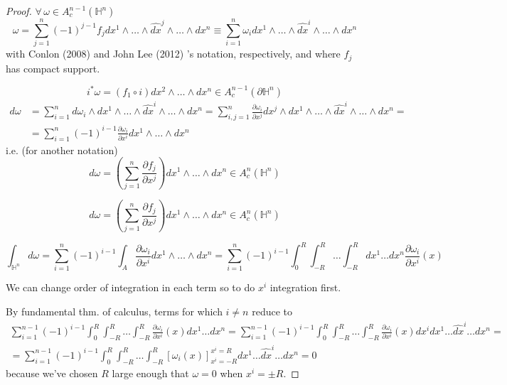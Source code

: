 \documentclass[10pt]{amsart}
\begin{document}
\begin{multicols*}{2}
\begin{proof}
$\forall \, \omega \in A_c^{n-1}(\mathbb{H}^n)$
\begin{equation}
\omega = \sum_{j=1}^n (-1)^{j-1} f_j dx^1 \wedge \dots \wedge \widehat{dx}^j \wedge \dots \wedge dx^n \equiv \sum_{i=1}^n \omega_i dx^1 \wedge \dots \wedge \widehat{dx}^i \wedge \dots \wedge dx^n
\end{equation}
with Conlon (2008) \cite{Conl2008} and John Lee (2012) \cite{JLee2012}'s notation, respectively, and where $f_j$ has compact support.  

\[
i^*\omega = (f_1 \circ i) dx^2 \wedge \dots \wedge dx^n \in A_c^{n-1}(\partial \mathbb{H}^n)
\]
\[ 
\begin{aligned}
d\omega & = \sum_{i=1}^n d\omega_i \wedge dx^1 \wedge \dots \wedge \widehat{dx}^i \wedge \dots \wedge dx^n = \sum_{i,j=1}^n \frac{\partial \omega_i}{ \partial x^j} dx^j \wedge dx^1 \wedge \dots \wedge \widehat{dx}^i \wedge \dots \wedge dx^n = \\
& = \sum_{i=1}^n (-1)^{i-1} \frac{ \partial \omega_i}{ \partial x^i } dx^1 \wedge \dots \wedge dx^n
\end{aligned}
\]
i.e. (for another notation)
\[
d\omega = \left( \sum_{j=1}^n \frac{\partial f_j}{ \partial x^j} \right) dx^1 \wedge \dots \wedge dx^n \in A_c^n(\mathbb{H}^n)
\]

\[
d\omega = \left( \sum_{j=1}^n \frac{\partial f_j}{ \partial x^j} \right) dx^1 \wedge \dots \wedge dx^n \in A_c^n(\mathbb{H}^n)
\]

\[
\int_{\mathbb{H}^n} d\omega = \sum_{i=1}^n (-1)^{i-1} \int_A \frac{ \partial \omega_i}{ \partial x^i } dx^1 \wedge \dots \wedge dx^n = \sum_{i=1}^n (-1)^{i-1} \int_0^R \int_{-R}^R \dots \int_{-R}^R dx^1 \dots dx^n \frac{ \partial \omega_i}{\partial x^i}(x)
\]

We can change order of integration in each term so to do $x^i$ integration first. 

By fundamental thm. of calculus, terms for which $i\neq n$ reduce to 
\[
\begin{gathered}
\sum_{i=1}^{n-1} (-1)^{i-1} \int_0^R \int_{-R}^R \dots \int_{-R}^R \frac{\partial \omega_i}{\partial x^i}(x) dx^1 \dots dx^n = \sum_{i=1}^{n-1} (-1)^{i-1} \int_0^R \int_{-R}^R \dots \int_{-R}^R \frac{\partial \omega_i}{\partial x^i}(x) dx^i dx^1 \dots \widehat{dx}^i \dots dx^n = \\
= \sum_{i=1}^{n-1} (-1)^{i-1} \int_0^R \int_{-R}^R \dots \int_{-R}^R [\omega_i(x)]_{x^i = -R}^{x^i = R} dx^1 \dots \widehat{dx}^i \dots dx^n = 0 
\end{gathered} 
\]
because we've chosen $R$ large enough that $\omega =0 $ when $x^i = \pm R$.  
	

\end{proof}
\end{multicols*}
\end{document}
